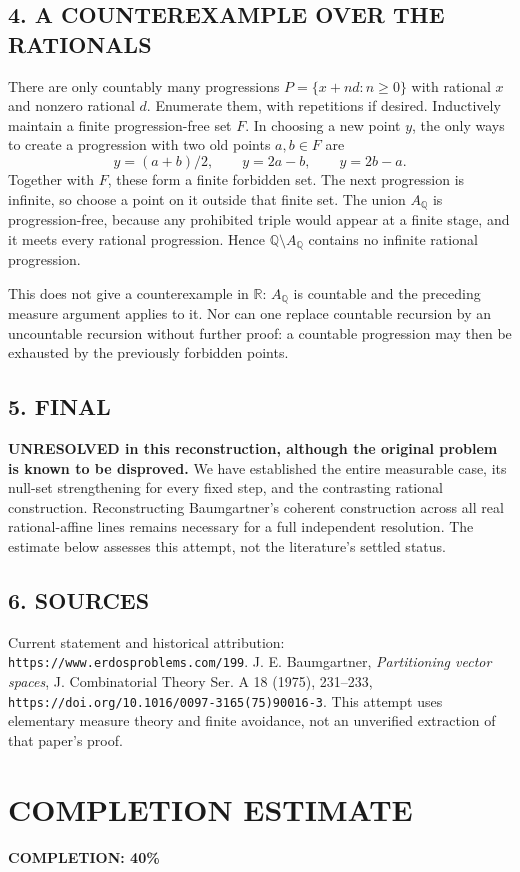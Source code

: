 \subsection*{4. A COUNTEREXAMPLE OVER THE RATIONALS}
There are only countably many progressions $P=\{x+nd:n\ge0\}$ with rational $x$ and nonzero rational $d$. Enumerate them, with repetitions if desired. Inductively maintain a finite progression-free set $F$. In choosing a new point $y$, the only ways to create a progression with two old points $a,b\in F$ are
\[
 y=(a+b)/2,\qquad y=2a-b,\qquad y=2b-a.
\]
Together with $F$, these form a finite forbidden set. The next progression is infinite, so choose a point on it outside that finite set. The union $A_{\mathbb Q}$ is progression-free, because any prohibited triple would appear at a finite stage, and it meets every rational progression. Hence $\mathbb Q\setminus A_{\mathbb Q}$ contains no infinite rational progression.

This does not give a counterexample in $\mathbb R$: $A_{\mathbb Q}$ is countable and the preceding measure argument applies to it. Nor can one replace countable recursion by an uncountable recursion without further proof: a countable progression may then be exhausted by the previously forbidden points.
\subsection*{5. FINAL}
\textbf{UNRESOLVED in this reconstruction, although the original problem is known to be disproved.}
We have established the entire measurable case, its null-set strengthening for every fixed step, and the contrasting rational construction. Reconstructing Baumgartner's coherent construction across all real rational-affine lines remains necessary for a full independent resolution. The estimate below assesses this attempt, not the literature's settled status.
\subsection*{6. SOURCES}
Current statement and historical attribution: \texttt{https://www.erdosproblems.com/199}. J. E. Baumgartner, \emph{Partitioning vector spaces}, J. Combinatorial Theory Ser. A 18 (1975), 231--233, \texttt{https://doi.org/10.1016/0097-3165(75)90016-3}. This attempt uses elementary measure theory and finite avoidance, not an unverified extraction of that paper's proof.
\section{COMPLETION ESTIMATE}
\textbf{COMPLETION: 40\%}

